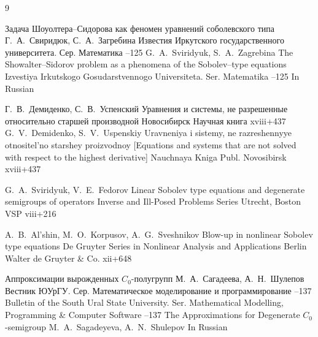 

\begin{thebibliography}{9}

\paper Задача Шоуолтера--Сидорова как феномен уравнений соболевского типа
\by Г.~А.~Свиридюк, С.~А.~Загребина
\jour Известия Иркутского государственного университета. Сер. Математика
--125
\misctransl
\by G.~A.~Sviridyuk, S.~A.~Zagrebina 
\paper The Showalter--Sidorov problem as a phenomena of the Sobolev--type equations
\jour Izvestiya Irkutskogo Gosudarstvennogo Universiteta. Ser. Matematika
--125
\miscnote In Russian


\by Г.~В.~Демиденко, С.~В.~Успенский
\book Уравнения и системы, не разрешенные относительно старшей производной
\publaddr Новосибирск
\publ Научная книга
\totalpages xviii+437 
\misctransl
\by G.~V.~Demidenko, S.~V.~Uspenskiy 
\book Uravneniya i sistemy, ne razreshennyye otnositel'no starshey proizvodnoy \rm [Equations and systems that are not solved with respect to the highest derivative]
\publ Nauchnaya Kniga Publ.
\publaddr  Novosibirsk
\totalpages xviii+437 


\by G.~A.~Sviridyuk, V.~E.~Fedorov
\book Linear Sobolev type equations and degenerate semigroups of operators
\serial Inverse and Ill-Posed Problems Series
\publaddr Utrecht, Boston
\publ VSP
\totalpages viii+216


\by A.~B.~Al'shin, M.~O.~Korpusov, A.~G.~Sveshnikov
\book Blow-up in nonlinear Sobolev type equations
\serial De Gruyter Series in Nonlinear Analysis and Applications
\publaddr Berlin
\publ Walter de Gruyter \& Co.
\totalpages xii+648


\paper Аппроксимации вырожденных $C_0$-полугрупп
\by М.~А.~Сагадеева, А.~Н.~Шулепов
\jour Вестник ЮУрГУ. Сер. Ма\-те\-ма\-ти\-чес\-кое мо\-де\-ли\-ро\-ва\-ние и про\-грам\-миро\-ва\-ние
--137
\misctransl
\jour Bulletin of the South Ural State University. Ser. Mathematical Modelling, Programming \& Computer Software
--137
\paper The Approximations for Degenerate $C_0$-semigroup
\by M.~A.~Sagadeyeva, A.~N.~Shulepov
\miscnote In Russian


\end{thebibliography}

